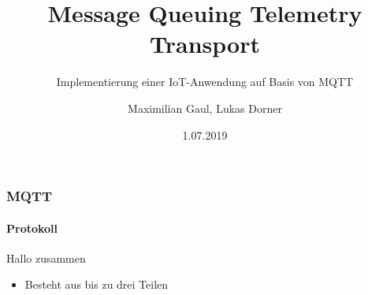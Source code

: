 \documentclass{beamer}
\title{Message Queuing Telemetry Transport}
\subtitle{Implementierung einer IoT-Anwendung auf Basis von MQTT}
\author{Maximilian Gaul, Lukas Dorner}
\date{1.07.2019}
\begin{document}
	
\begin{frame}
	\titlepage
\end{frame}

\begin{frame}
\frametitle{MQTT}
\framesubtitle{Protokoll}
Hallo zusammen
\begin{itemize}
	\item Besteht aus bis zu drei Teilen
\end{itemize}

\end{frame}
\end{document}
